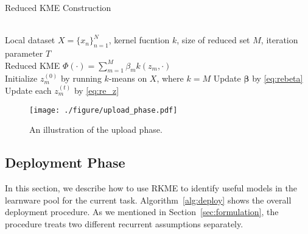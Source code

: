 \documentclass[paper=letter, fontsize=20pt]{article}
\renewcommand{\algorithmicrequire}{ \textbf{Input:}}
\renewcommand{\algorithmicensure}{ \textbf{Output:}}
\begin{document}
\begin{algorithm}[htb]
   \caption{Reduced KME Construction}
   \label{alg:rs}
\begin{algorithmic}[1]
\renewcommand{\algorithmicrequire}{\textbf{input:}}
\renewcommand{\algorithmicensure}{\textbf{output:}}
\REQUIRE~~\\
    Local dataset $X=\{x_n\}_{n=1}^N$, kernel fucntion $k$, size of reduced set $M$, iteration parameter $T$
\ENSURE~~\\
  Reduced KME $\Phi(\cdot)=\sum_{m=1}^{M}\beta_m k(z_m,\cdot)$
\renewcommand{\algorithmicrequire}{\textbf{procedure:}}
\REQUIRE~~\\
\STATE Initialize $z^{(0)}_m$ by running $k$-means on $X$, where $k=M$
\STATE Update $\bm{\beta}$ by \eqref{eq:rebeta}
\STATE Update each $z_m^{(t)}$ by \eqref{eq:re_z}
\ENDFOR
\end{algorithmic}
\end{algorithm}
\begin{figure*}[htb]
\centering
\texttt{[image: ./figure/upload\_phase.pdf]}
\caption{An illustration of the upload phase.}\label{fig:upload_phase}
\end{figure*}

\subsection{Deployment Phase}
In this section, we describe how to use RKME to identify useful models in the learnware pool for the current task.  Algorithm~\ref{alg:deploy} shows the overall deployment procedure. As we mentioned in Section~\ref{sec:formulation}, the procedure treats two different recurrent assumptions separately. 
\end{document}

